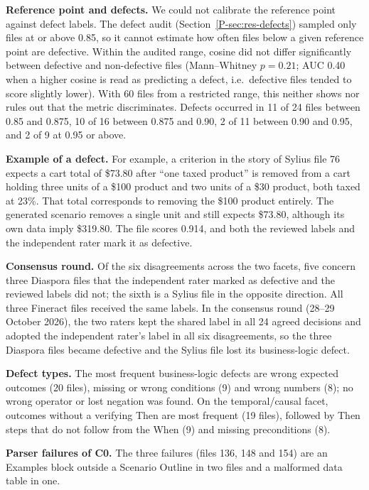 \textbf{Reference point and defects.} We could not calibrate the reference point against defect labels. The defect audit (Section~\ref{P-sec:res-defects}) sampled only files at or above 0.85, so it cannot estimate how often files below a given reference point are defective. Within the audited range, cosine did not differ significantly between defective and non-defective files (Mann--Whitney $p = 0.21$; AUC 0.40 when a higher cosine is read as predicting a defect, i.e.\ defective files tended to score slightly lower). With 60 files from a restricted range, this neither shows nor rules out that the metric discriminates. Defects occurred in 11 of 24 files between 0.85 and 0.875, 10 of 16 between 0.875 and 0.90, 2 of 11 between 0.90 and 0.95, and 2 of 9 at 0.95 or above.

\textbf{Example of a defect.} For example, a criterion in the story of Sylius file 76 expects a cart total of \$73.80 after ``one taxed product'' is removed from a cart holding three units of a \$100 product and two units of a \$30 product, both taxed at 23\%. That total corresponds to removing the \$100 product entirely. The generated scenario removes a single unit and still expects \$73.80, although its own data imply \$319.80. The file scores 0.914, and both the reviewed labels and the independent rater mark it as defective.

\textbf{Consensus round.} Of the six disagreements across the two facets, five concern three Diaspora files that the independent rater marked as defective and the reviewed labels did not; the sixth is a Sylius file in the opposite direction. All three Fineract files received the same labels. In the consensus round (28--29 October 2026), the two raters kept the shared label in all 24 agreed decisions and adopted the independent rater's label in all six disagreements, so the three Diaspora files became defective and the Sylius file lost its business-logic defect.

\textbf{Defect types.} The most frequent business-logic defects are wrong expected outcomes (20 files), missing or wrong conditions (9) and wrong numbers (8); no wrong operator or lost negation was found. On the temporal/causal facet, outcomes without a verifying Then are most frequent (19 files), followed by Then steps that do not follow from the When (9) and missing preconditions (8).

\textbf{Parser failures of C0.} The three failures (files 136, 148 and 154) are an Examples block outside a Scenario Outline in two files and a malformed data table in one.

